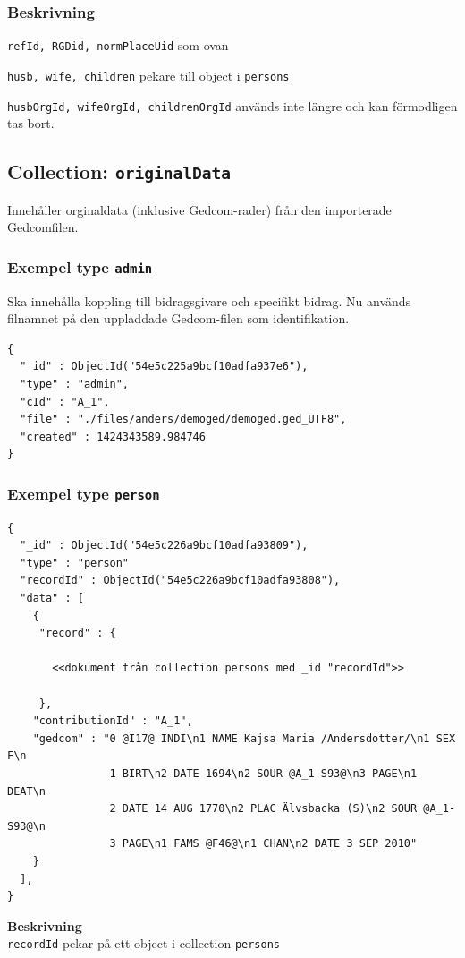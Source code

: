 \documentclass[swedish,11pt]{article}
\begin{document}
\subsubsection{Beskrivning}
\verb+refId, RGDid, normPlaceUid+ som ovan

\verb+husb, wife, children+ pekare till object i \verb+persons+

\verb+husbOrgId, wifeOrgId, childrenOrgId+ används inte längre och kan
förmodligen tas bort.
 
\subsection{Collection: \tt originalData}
Innehåller orginaldata (inklusive Gedcom-rader) från den importerade
Gedcomfilen.

\subsubsection{Exempel type \tt admin}
Ska innehålla koppling till bidragsgivare och specifikt bidrag. Nu
används filnamnet på den uppladdade Gedcom-filen som identifikation.
\begin{verbatim}
{
  "_id" : ObjectId("54e5c225a9bcf10adfa937e6"),
  "type" : "admin",
  "cId" : "A_1",
  "file" : "./files/anders/demoged/demoged.ged_UTF8",
  "created" : 1424343589.984746
}
\end{verbatim}

\subsubsection{Exempel type \tt person}
\begin{verbatim}
{
  "_id" : ObjectId("54e5c226a9bcf10adfa93809"),
  "type" : "person"
  "recordId" : ObjectId("54e5c226a9bcf10adfa93808"),
  "data" : [
    {
     "record" : {

       <<dokument från collection persons med _id "recordId">>

     },
    "contributionId" : "A_1",
    "gedcom" : "0 @I17@ INDI\n1 NAME Kajsa Maria /Andersdotter/\n1 SEX F\n
                1 BIRT\n2 DATE 1694\n2 SOUR @A_1-S93@\n3 PAGE\n1 DEAT\n
                2 DATE 14 AUG 1770\n2 PLAC Älvsbacka (S)\n2 SOUR @A_1-S93@\n
                3 PAGE\n1 FAMS @F46@\n1 CHAN\n2 DATE 3 SEP 2010"
    }
  ],
}
\end{verbatim}
{\bf Beskrivning}\\
\verb+recordId+ pekar på ett object i collection \verb+persons+
\end{document}
